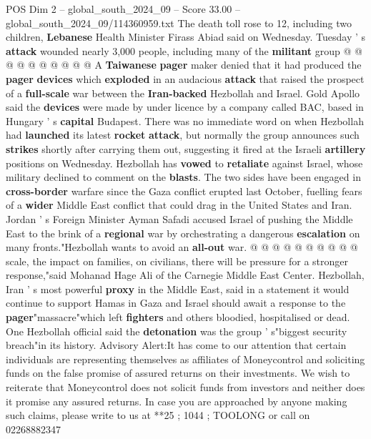 \begin{textsample}{POS Dim 2 – global\_south\_2024\_09 – Score 33.00 – global\_south\_2024\_09/114360959.txt}
The death toll rose to 12, including two children, \textbf{Lebanese} Health Minister Firass Abiad said on Wednesday.
Tuesday ' s \textbf{attack} wounded nearly 3,000 people, including many of the \textbf{militant} group @ @ @ @ @ @ @ @ @ @ A \textbf{Taiwanese} \textbf{pager} maker denied that it had produced the \textbf{pager} \textbf{devices} which \textbf{exploded} in an audacious \textbf{attack} that raised the prospect of a \textbf{full-scale} war between the \textbf{Iran-backed} Hezbollah and Israel.
Gold Apollo said the \textbf{devices} were made by under licence by a company called BAC, based in Hungary ' s \textbf{capital} Budapest.
There was no immediate word on when Hezbollah had \textbf{launched} its latest \textbf{rocket} \textbf{attack}, but normally the group announces such \textbf{strikes} shortly after carrying them out, suggesting it fired at the Israeli \textbf{artillery} positions on Wednesday.
Hezbollah has \textbf{vowed} to \textbf{retaliate} against Israel, whose military declined to comment on the \textbf{blasts}.
The two sides have been engaged in \textbf{cross-border} warfare since the Gaza conflict erupted last October, fuelling fears of a \textbf{wider} Middle East conflict that could drag in the United States and Iran.
Jordan ' s Foreign Minister Ayman Safadi accused Israel of pushing the Middle East to the brink of a \textbf{regional} war by orchestrating a dangerous \textbf{escalation} on many fronts."Hezbollah wants to avoid an \textbf{all-out} war. @ @ @ @ @ @ @ @ @ @ scale, the impact on families, on civilians, there will be pressure for a stronger response,"said Mohanad Hage Ali of the Carnegie Middle East Center.
Hezbollah, Iran ' s most powerful \textbf{proxy} in the Middle East, said in a statement it would continue to support Hamas in Gaza and Israel should await a response to the \textbf{pager}"massacre"which left \textbf{fighters} and others bloodied, hospitalised or dead.
One Hezbollah official said the \textbf{detonation} was the group ' s"biggest security breach"in its history.
Advisory Alert:It has come to our attention that certain individuals are representing themselves as affiliates of Moneycontrol and soliciting funds on the false promise of assured returns on their investments.
We wish to reiterate that Moneycontrol does not solicit funds from investors and neither does it promise any assured returns.
In case you are approached by anyone making such claims, please write to us at **25 ; 1044 ; TOOLONG or call on 02268882347

\end{textsample}
